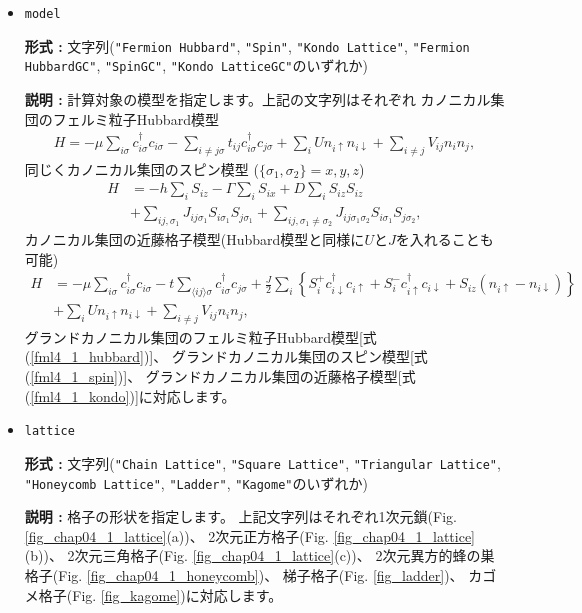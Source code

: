 \begin{itemize}

\item \verb|model|

{\bf 形式 :} 文字列(\verb|"Fermion Hubbard"|, \verb|"Spin"|, \verb|"Kondo Lattice"|, 
\verb|"Fermion HubbardGC"|, \verb|"SpinGC"|, \verb|"Kondo LatticeGC"|のいずれか)

{\bf 説明 :} 計算対象の模型を指定します。上記の文字列はそれぞれ
カノニカル集団のフェルミ粒子Hubbard模型
\begin{align}
H = - \mu \sum_{i \sigma} c^\dagger_{i \sigma} c_{i \sigma} 
- \sum_{i \neq j \sigma} t_{i j} c^\dagger_{i \sigma} c_{j \sigma} 
+ \sum_{i} U n_{i \uparrow} n_{i \downarrow}
+ \sum_{i \neq j} V_{i j} n_{i} n_{j},
\label{fml4_1_hubbard}
\end{align}
同じくカノニカル集団のスピン模型 ($\{\sigma_1, \sigma_2\}={x, y, z}$)
\begin{align}
H &= -h \sum_{i} S_{i z} - \Gamma \sum_{i} S_{i x} + D \sum_{i} S_{i z} S_{i z}
\nonumber \\
&+ \sum_{i j, \sigma_1}J_{i j \sigma_1} S_{i \sigma_1} S_{j \sigma_1}+ \sum_{i j, \sigma_1 \neq \sigma_2} J_{i j \sigma_1 \sigma_2} S_{i \sigma_1} S_{j \sigma_2} ,
\label{fml4_1_spin}
\end{align}
カノニカル集団の近藤格子模型(Hubbard模型と同様に$U$と$J$を入れることも可能)
\begin{align}
H &= - \mu \sum_{i \sigma} c^\dagger_{i \sigma} c_{i \sigma} 
- t \sum_{\langle i j \rangle \sigma} c^\dagger_{i \sigma} c_{j \sigma} 
+ \frac{J}{2} \sum_{i} \left\{
S_{i}^{+} c_{i \downarrow}^\dagger c_{i \uparrow}
+ S_{i}^{-} c_{i \uparrow}^\dagger c_{i \downarrow}
+ S_{i z} (n_{i \uparrow} - n_{i \downarrow})\right\}
\nonumber \\
& +  \sum_{i} U n_{i \uparrow} n_{i \downarrow}
+ \sum_{i \neq j} V_{i j} n_{i} n_{j}
,
\label{fml4_1_kondo}
\end{align}
グランドカノニカル集団のフェルミ粒子Hubbard模型[式(\ref{fml4_1_hubbard})]、
グランドカノニカル集団のスピン模型[式(\ref{fml4_1_spin})]、
グランドカノニカル集団の近藤格子模型[式(\ref{fml4_1_kondo})]に対応します。

\item \verb|lattice|

{\bf 形式 :} 文字列(\verb|"Chain Lattice"|, \verb|"Square Lattice"|, 
\verb|"Triangular Lattice"|, \verb|"Honeycomb Lattice"|, \verb|"Ladder"|, \verb|"Kagome"|のいずれか)

{\bf 説明 :} 格子の形状を指定します。
上記文字列はそれぞれ1次元鎖(Fig. \ref{fig_chap04_1_lattice}(a))、
2次元正方格子(Fig. \ref{fig_chap04_1_lattice}(b))、
2次元三角格子(Fig. \ref{fig_chap04_1_lattice}(c))、
2次元異方的蜂の巣格子(Fig. \ref{fig_chap04_1_honeycomb})、
梯子格子(Fig. \ref{fig_ladder})、
カゴメ格子(Fig. \ref{fig_kagome})に対応します。


\end{itemize}
